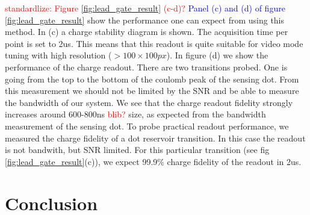 \documentclass[twocolumn]{article}
\begin{document}
\textcolor{red}{standardlize: Figure \ref{fig:lead_gate_result} (c-d)?} \textcolor{blue}{Panel (c) and (d) of figure \ref{fig:lead_gate_result}} show the performance one can expect from using this method. In (c) a charge stability diagram is shown. The acquisition time per point is set to 2us. This means that this readout is quite suitable for video mode tuning with high resolution ($>100\times100px$). In figure (d) we show the performance of the charge readout. There are two transitions probed. One is going from the top to the bottom of the coulomb peak of the sensing dot. From this measurement we should not be limited by the SNR and be able to measure the bandwidth of our system. We see that the charge readout fidelity strongly increases around 600-800ns \textcolor{red}{blib?} size, as expected from the bandwidth measurement of the sensing dot. To probe practical readout performance, we measured the charge fidelity of a dot reservoir transition. In this case the readout is not bandwith, but SNR limited. For this particular transition (see fig \ref{fig:lead_gate_result}(c)), we expect 99.9\% charge fidelity of the readout in 2us.

\section{Conclusion}






	
\end{document}
